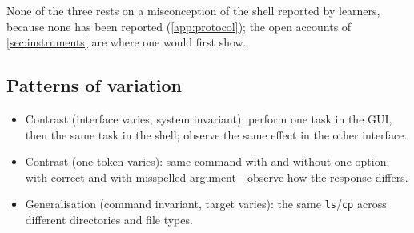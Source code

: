 None of the three rests on a misconception of the shell reported by
learners, because none has been reported (\cref{app:protocol}); the open
accounts of \cref{sec:instruments} are where one would first show.

\subsection{Patterns of variation}

\begin{itemize}
  \item Contrast (interface varies, system invariant): perform one task in
    the GUI, then the same task in the shell; observe the same effect in
    the other interface.
  \item Contrast (one token varies): same command with and without one
    option; with correct and with misspelled argument---observe how the
    response differs.
  \item Generalisation (command invariant, target varies): the same
    \texttt{ls}/\texttt{cp} across different directories and file types.
\end{itemize}

